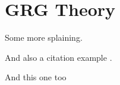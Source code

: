 \section{GRG Theory}

Some more splaining.

And also a citation example \cite{Forte2011}.

And this one too \cite{Forte2013}




